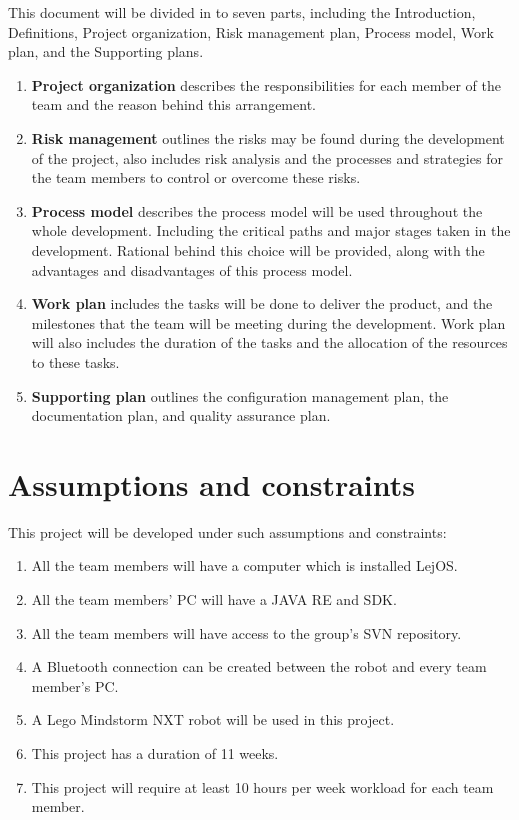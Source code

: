 \documentclass[11pt, a4paper]{report}
\begin{document}
This document will be divided in to seven parts, including the Introduction, Definitions, Project organization, Risk management plan, Process model, Work plan, and the Supporting plans.

\begin{enumerate}
	\item \textbf{Project organization} describes the responsibilities for each member of the team and the reason behind this arrangement.
	\item \textbf{Risk management} outlines the risks may be found during the development of the project, also includes risk analysis and the processes and strategies for the team members to control or overcome these risks.
	\item \textbf{Process model} describes the process model will be used throughout the whole development. Including the critical paths and major stages taken in the development. Rational behind this choice will be provided, along with the advantages and disadvantages of this process model. 
	\item \textbf{Work plan} includes the tasks will be done to deliver the product, and the milestones that the team will be meeting during the development. Work plan will also includes the duration of the tasks and the allocation of the resources to these tasks.
	\item \textbf{Supporting plan} outlines the configuration management plan, the documentation plan, and quality assurance plan.
\end{enumerate}


\section{Assumptions and constraints}
This project will be developed under such assumptions and constraints:
\begin{enumerate}
	\item All the team members will have a computer which is installed LejOS.
	\item All the team members' PC will have a JAVA RE and SDK.
	\item All the team members will have access to the group's SVN repository.
	\item A Bluetooth connection can be created between the robot and every team member's PC.
	\item A Lego Mindstorm NXT robot will be used in this project. 
	\item This project has a duration of 11 weeks.
	\item This project will require at least 10 hours per week workload for each team member.
\end{enumerate}
\end{document}
